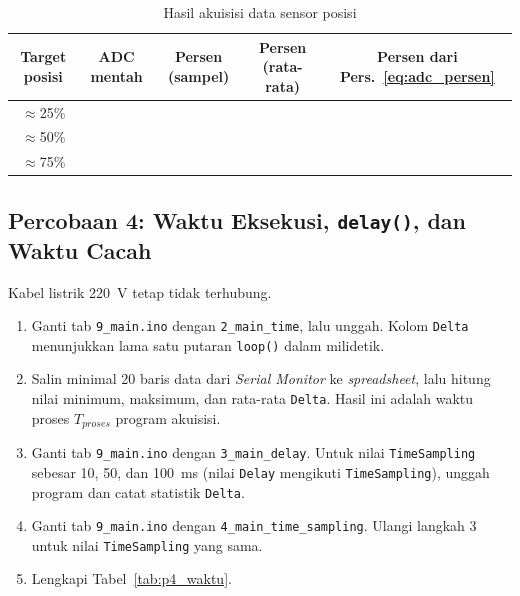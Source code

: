 \documentclass[11pt,a4paper]{article}
\newcommand{\prog}[1]{\texttt{#1}}
\begin{document}
\begin{table}[H]
	\centering
	\caption{Hasil akuisisi data sensor posisi}
	\label{tab:p3_akuisisi}
	\begin{tabularx}{\textwidth}{|C|C|C|C|C|}
		\hline
		\textbf{Target posisi} & \textbf{ADC mentah} & \textbf{Persen (sampel)} & \textbf{Persen (rata-rata)} & \textbf{Persen dari Pers.~\eqref{eq:adc_persen}} \\
		\hline
		$\approx$25\%        &                     &                          &                             &                            \\
		$\approx$50\%        &                     &                          &                             &                            \\
		$\approx$75\%        &                     &                          &                             &                            \\
		\hline
	\end{tabularx}
\end{table}

\subsection{Percobaan 4: Waktu Eksekusi, \texttt{delay()}, dan Waktu Cacah}
Kabel listrik 220~V tetap tidak terhubung.
\begin{enumerate}
	\item Ganti tab \prog{9\_main.ino} dengan \prog{2\_main\_time}, lalu unggah. Kolom \texttt{Delta} menunjukkan lama satu putaran \texttt{loop()} dalam milidetik.
	\item Salin minimal 20 baris data dari \textit{Serial Monitor} ke \textit{spreadsheet}, lalu hitung nilai minimum, maksimum, dan rata-rata \texttt{Delta}. Hasil ini adalah waktu proses $T_{proses}$ program akuisisi.
	\item Ganti tab \prog{9\_main.ino} dengan \prog{3\_main\_delay}. Untuk nilai \texttt{TimeSampling} sebesar 10, 50, dan 100~ms (nilai \texttt{Delay} mengikuti \texttt{TimeSampling}), unggah program dan catat statistik \texttt{Delta}.
	\item Ganti tab \prog{9\_main.ino} dengan \prog{4\_main\_time\_sampling}. Ulangi langkah 3 untuk nilai \texttt{TimeSampling} yang sama.
	\item Lengkapi Tabel~\ref{tab:p4_waktu}.
\end{enumerate}
\end{document}

